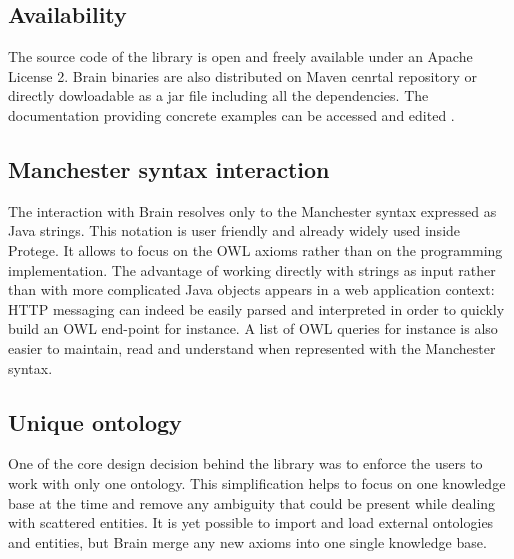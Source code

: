 \documentclass{llncs}
\begin{document}
\subsection{Availability}
The source code of the library is open and freely available \cite{github} under an Apache License 2.
Brain binaries are also distributed on Maven cenrtal repository or directly dowloadable as a jar file including all the dependencies.
The documentation providing concrete examples can be accessed and edited \cite{wiki}.

\subsection{Manchester syntax interaction}
The interaction with Brain resolves only to the Manchester syntax \cite{Horridge2006} expressed as Java strings.
This notation is user friendly and already widely used inside Protege. It allows to focus on the OWL axioms rather than on the programming implementation.
The advantage of working directly with strings as input rather than with more complicated Java objects appears in a web application context:
HTTP messaging can indeed be easily parsed and interpreted in order to quickly build an OWL end-point for instance.
A list of OWL queries for instance is also easier to maintain, read and understand when represented with the Manchester syntax.

\subsection{Unique ontology}
One of the core design decision behind the library was to enforce the users to work with only one ontology.
This simplification helps to focus on one knowledge base at the time and remove any ambiguity that could be present while
dealing with scattered entities. It is yet possible to import and load external ontologies
and entities, but Brain merge any new axioms into one single knowledge base.
\end{document}

